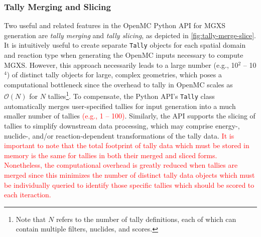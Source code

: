 \subsubsection{Tally Merging and Slicing}
\label{subsubsec:tally-slice-merge}

Two useful and related features in the OpenMC Python API for MGXS generation are \emph{tally merging} and \emph{tally slicing}, as depicted in \cref{fig:tally-merge-slice}. It is intuitively useful to create separate \texttt{Tally} objects for each spatial domain and reaction type when generating the OpenMC inputs necessary to compute MGXS. However, this approach necessarily leads to a large number (e.g., 10$^2$ -- 10$^4$) of distinct tally objects for large, complex geometries, which poses a computational bottleneck since the overhead to tally in OpenMC scales as $\mathcal{O}(N)$ for $N$ tallies\footnote{Note that $N$ refers to the number of tally definitions, each of which can contain multiple filters, nuclides, and scores.}. To compensate, the Python API's \texttt{Tally} class automatically merges user-specified tallies for input generation into a much smaller number of tallies \textcolor{red}{(e.g., 1 -- 100)}. Similarly, the API supports the slicing of tallies to simplify downstream data processing, which may comprise energy-, nuclide-, and/or reaction-dependent transformations of the tally data. \textcolor{red}{It is important to note that the total footprint of tally data which must be stored in memory is the same for tallies in both their merged and sliced forms. Nonetheless, the computational overhead is greatly reduced when tallies are merged since this minimizes the number of distinct tally data objects which must be individually queried to identify those specific tallies which should be scored to each iteraction.}

